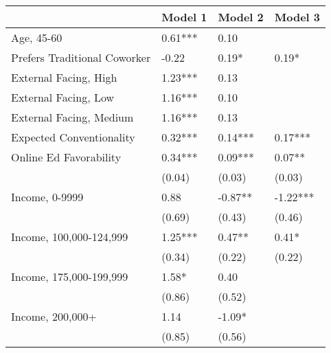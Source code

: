 \begin{table}
    \caption{}
    \label{}
    \begin{center}
    \begin{tabular}{llll}
    \hline
                                                   & Model 1 & Model 2 & Model 3  \\
    \hline
    Age, 45-60                                    & 0.61***                & 0.10         &                \\
    Prefers Traditional Coworker                      & -0.22                  & 0.19*        & 0.19*          \\
    External Facing, High & 1.23***                & 0.13         &                \\
    External Facing, Low & 1.16***                & 0.10         &                \\
    External Facing, Medium & 1.16***                & 0.13         &                \\
    Expected Conventionality                       & 0.32***                & 0.14***      & 0.17***        \\
    Online Ed Favorability                              & 0.34***                & 0.09***      & 0.07**     \\
                                                   & (0.04)                 & (0.03)       & (0.03)         \\
    Income, 0-9999                                & 0.88                   & -0.87**      & -1.22***       \\
                                                   & (0.69)                 & (0.43)       & (0.46)         \\
    Income, 100,000-124,999                         & 1.25***                & 0.47**       & 0.41*          \\
                                                   & (0.34)                 & (0.22)       & (0.22)         \\
    Income, 175,000-199,999                         & 1.58*                  & 0.40         &                \\
                                                   & (0.86)                 & (0.52)       &                \\
    Income, 200,000+                                 & 1.14                   & -1.09*       &                \\
                                                   & (0.85)                 & (0.56)       &                \\

\end{tabular}
\end{center}
\end{table}
